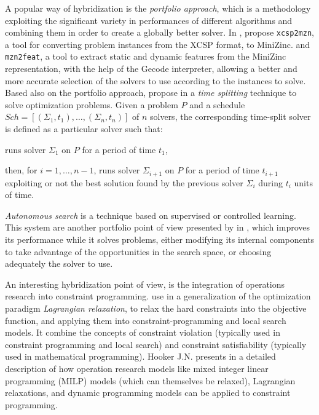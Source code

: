 A popular way of hybridization is the \textit{portfolio approach}, which is a methodology exploiting the significant variety in performances of different algorithms and combining them in order to create a globally better solver. In \cite{Amadini},  propose \texttt{xcsp2mzn}, a tool for converting problem instances from the XCSP format, %
to {\sc MiniZinc}. %
and \texttt{mzn2feat}, a tool to extract static and dynamic features from the {\sc MiniZinc} representation, with the help of the {\sc Gecode} interpreter, allowing a better and more accurate selection of the solvers to use according to the instances to solve. %
Based also on the portfolio approach,  propose in \cite{Amadini2014} a \textit{time splitting} technique to solve optimization problems. Given a problem $P$ and a schedule $Sch = \left[(\Sigma_1, t_1),\dots,(\Sigma_n, t_n)\right]$ of $n$ solvers, the corresponding time-split solver is defined as a particular solver such that:  
\begin{inparaenum} %
\item runs solver $\Sigma_1$ on $P$ for a period of time $t_1$, 
\item then, for $i = 1,\dots, n-1$, runs solver $\Sigma_{i+1}$ on $P$ for a period of time $t_{i+1}$ exploiting or not the best solution found by  the previous solver $\Sigma_i$ during $t_i$ units of time.
\end{inparaenum}%
{\it Autonomous search} is a technique based on supervised or controlled learning. This system are another portfolio point of view presented by  in \cite{WhatIsAuto}, which improves its performance while it solves problems, either modifying its internal components to take advantage of the opportunities in the search space, or choosing adequately the solver to use.

An interesting hybridization point of view, is the integration of operations research into constraint programming.  use in \cite{Fontaine2014} a generalization of the optimization paradigm \textit{Lagrangian relaxation}, to relax the hard constraints into the objective function, and applying them into constraint-programming and local search models. It combine the concepts of constraint violation (typically used in constraint programming and local search) and constraint satisfiability (typically used in mathematical programming). Hooker J.N. presents in \cite{Hooker2006} a detailed description of how operation research models like mixed integer linear programming (MILP) models (which can themselves be relaxed), Lagrangian relaxations, and dynamic programming models can be applied to constraint programming. 

